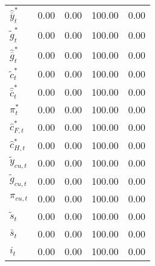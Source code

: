 \begin{center}
\begin{longtable}{lcccc}
${\hat {\bar y}_t^*}  $	 & 	                0.00	 & 	                0.00	 & 	              100.00	 & 	                0.00 \\ 
${\tilde g_t^*}       $	 & 	                0.00	 & 	                0.00	 & 	              100.00	 & 	                0.00 \\ 
${\hat {\bar g}_t^*}  $	 & 	                0.00	 & 	                0.00	 & 	              100.00	 & 	                0.00 \\ 
${\tilde c_t^*}       $	 & 	                0.00	 & 	                0.00	 & 	              100.00	 & 	                0.00 \\ 
${\hat {\bar c}_t^*}  $	 & 	                0.00	 & 	                0.00	 & 	              100.00	 & 	                0.00 \\ 
${\pi_t^*}            $	 & 	                0.00	 & 	                0.00	 & 	              100.00	 & 	                0.00 \\ 
${\hat c_{F,t}^*}     $	 & 	                0.00	 & 	                0.00	 & 	              100.00	 & 	                0.00 \\ 
${\hat c_{H,t}^*}     $	 & 	                0.00	 & 	                0.00	 & 	              100.00	 & 	                0.00 \\ 
${\tilde y_{cu,t}}    $	 & 	                0.00	 & 	                0.00	 & 	              100.00	 & 	                0.00 \\ 
${\tilde g_{cu,t}}    $	 & 	                0.00	 & 	                0.00	 & 	              100.00	 & 	                0.00 \\ 
${\pi_{cu,t}}         $	 & 	                0.00	 & 	                0.00	 & 	              100.00	 & 	                0.00 \\ 
${\tilde s_t}         $	 & 	                0.00	 & 	                0.00	 & 	              100.00	 & 	                0.00 \\ 
${\bar s_t}           $	 & 	                0.00	 & 	                0.00	 & 	              100.00	 & 	                0.00 \\ 
${i_t}                $	 & 	                0.00	 & 	                0.00	 & 	              100.00	 & 	                0.00 \\ 
\end{longtable}
 \end{center}
